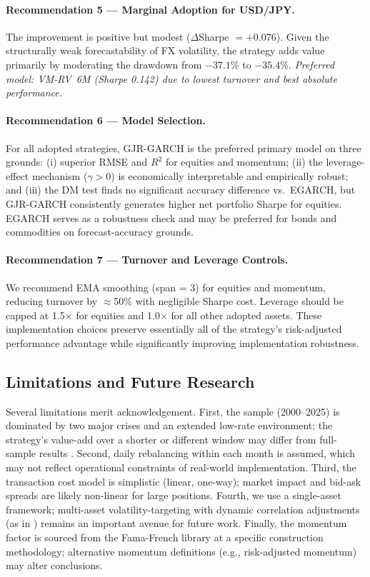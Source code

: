 \documentclass[12pt, a4paper]{article}
\begin{document}
\paragraph{Recommendation 5 --- Marginal Adoption for USD/JPY.} The improvement is
positive but modest ($\Delta$Sharpe $= +0.076$). Given the structurally weak
forecastability of FX volatility, the strategy adds value primarily by moderating the
drawdown from $-37.1\%$ to $-35.4\%$. \textit{Preferred model: VM-RV~6M (Sharpe 0.142)
due to lowest turnover and best absolute performance.}

\paragraph{Recommendation 6 --- Model Selection.} For all adopted strategies, GJR-GARCH
is the preferred primary model on three grounds: (i) superior RMSE and $R^2$ for equities
and momentum; (ii) the leverage-effect mechanism ($\gamma > 0$) is economically
interpretable and empirically robust; and (iii) the DM test finds no significant accuracy
difference vs.\ EGARCH, but GJR-GARCH consistently generates higher net portfolio Sharpe
for equities. EGARCH serves as a robustness check and may be preferred for bonds and
commodities on forecast-accuracy grounds.

\paragraph{Recommendation 7 --- Turnover and Leverage Controls.} We recommend EMA
smoothing (span = 3) for equities and momentum, reducing turnover by $\approx$50\% with
negligible Sharpe cost. Leverage should be capped at 1.5$\times$ for equities and
1.0$\times$ for all other adopted assets. These implementation choices preserve
essentially all of the strategy's risk-adjusted performance advantage while significantly
improving implementation robustness.

\subsection{Limitations and Future Research}

Several limitations merit acknowledgement. First, the sample (2000--2025) is dominated by
two major crises and an extended low-rate environment; the strategy's value-add over a
shorter or different window may differ from full-sample results \citep{Liu2019}. Second,
daily rebalancing within each month is assumed, which may not reflect operational
constraints of real-world implementation. Third, the transaction cost model is simplistic
(linear, one-way); market impact and bid-ask spreads are likely non-linear for large
positions. Fourth, we use a single-asset framework; multi-asset volatility-targeting with
dynamic correlation adjustments (as in \citealt{Bongaerts2020}) remains an important
avenue for future work. Finally, the momentum factor is sourced from the Fama-French
library at a specific construction methodology; alternative momentum definitions
(e.g., risk-adjusted momentum) may alter conclusions.
\end{document}
